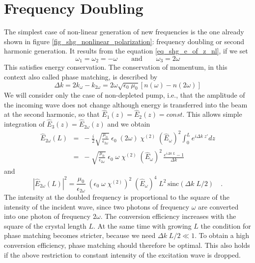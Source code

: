 \section{Frequency Doubling}

The simplest case of non-linear generation of new frequencies
is the one already shown in figure \ref{fig_shg_nonlinear_polarization}: 
 frequency doubling or second harmonic generation. It results from the equation
\ref{eq_shg_e_of_z_nl}, if we set
\begin{equation}
  \omega_1 = \omega_2 = - \omega \qquad \text{and} \qquad
  \omega_3 = 2\omega
\end{equation}
This satisfies  energy conservation. The
conservation of momentum, in this context also called phase matching, is described by
\begin{equation}
 \Delta k = 2 k_{\omega} - k_{2 \omega} = 2 \omega
 \sqrt{\epsilon_0 \; \mu_0} \left[ n(\omega) - n(2 \omega) \right]
\end{equation}
We will consider only the case of non-depleted pump, i.e., that the amplitude of the incoming wave does not change although energy is transferred into the beam at the second harmonic, so that
$\hat{E}_1(z) = \hat{E}_2(z)
= const$. This allows simple integration of $\hat{E}_3(z) = \hat{E}_{2\omega}(z)$
and we obtain
\begin{eqnarray}
 \hat{E}_{2\omega}(L) &=& - \; \frac{i}{2}   \sqrt{ \frac{\mu_0} {\epsilon_{2\omega}}}\;\epsilon_0
  \; (2 \omega) \; \chi^{(2)} \; (\hat{E}_{\omega})^2   \int_0^L  e^{i  \Delta k \;
  z'} dz  \\
  &= & %
- \;    \sqrt{ \frac{\mu_0} {\epsilon_{2\omega}}}\;\epsilon_0
  \;  \omega \; \chi^{(2)} \; (\hat{E}_{\omega})^2  \, \frac{  e^{i  \Delta k \;
  L} -1}{\Delta k}
\end{eqnarray}
and
\begin{equation}
  \left| \hat{E}_{2\omega}(L) \right|^2 = %
  \frac{\mu_0} {\epsilon_{2\omega}} \; \left(\epsilon_0
  \;  \omega \; \chi^{(2)} \right)^2 \; (\hat{E}_{\omega})^4  \; L^2 \, \text{sinc} ( \Delta k \; L /2 )
   \quad . \label{eq_shg_efficiency_shg}
\end{equation}
The intensity at the doubled frequency is proportional to
the square of the intensity of the incident wave, since two photons
of frequency $\omega$ are converted into one photon of frequency $2\omega$. The conversion efficiency increases with the
square of the crystal  length $L$. At the same time with 
growing $L$ the condition for phase matching becomes stricter, because we need 
$\Delta k \; L / 2 \ll 1 $. To obtain a high
conversion efficiency, phase matching should therefore be
 optimal. This also holds if the above restriction to
constant intensity of the excitation wave is dropped.

